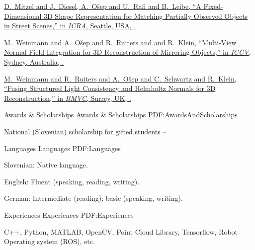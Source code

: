 \documentclass[letterpaper,MMMyyyy,nonstopmode]{simpleresumecv}
\begin{document}
\begin{Body}
\Gap
\href{https://www.vision.rwth-aachen.de/media/papers/mitzel15icra_3d_shape_representation.pdf}
{D.~Mitzel and J.~Diesel, \underline{A.~O\v{s}ep} and U.~Rafi and B.~Leibe,
``A Fixed-Dimensional 3D Shape Representation for Matching Partially Observed Objects in Street Scenes,''
in \textit{ICRA},
Seattle, USA,
.}

\Gap
\href{https://www.vision.rwth-aachen.de/media/papers/weinmann_reconstruction_of_mirroring_objects_iccv2013.pdf}
{M.~Weinmann and \underline{A.~O\v{s}ep} and R.~Ruiters and and R.~Klein,
``Multi-View Normal Field Integration for 3D Reconstruction of Mirroring Objects,''
in \textit{ICCV},
Sydney, Australia,
.}

\Gap
\href{https://www.vision.rwth-aachen.de/media/papers/weinmann-2012-3DReconstruction.pdf}
{M.~Weinmann and R.~Ruiters and \underline{A.~O\v{s}ep} and C.~Schwartz and R.~Klein,
``Fusing Structured Light Consistency and Helmholtz Normals for 3D Reconstruction,''
in \textit{BMVC},
Surrey, UK,
.}

\endgroup


\Section
{Awards \&\newline
Scholarships}
{Awards \& Scholarships}
{PDF:AwardsAndScholarships}

\Gap
\BulletItem
\href{http://www.sklad-kadri.si/en/scholarships/zois-scholarships/}{National (Slovenian) scholarship for gifted students}
\hfill
{} --
\newline


\Section
{Languages}
{Languages}
{PDF:Languages}

\BulletItem
Slovenian: Native language.

\Gap
\BulletItem
English: Fluent (speaking, reading, writing).

\Gap
\BulletItem
German: Intermediate (reading); basic (speaking, writing).


\Section
{Experiences}
{Experiences}
{PDF:Experiences}

C++,
Python,
MATLAB,
OpenCV,
Point Cloud Library,
Tensorflow,
Robot Operating system (ROS),
etc.


\end{Body}
\end{document}
